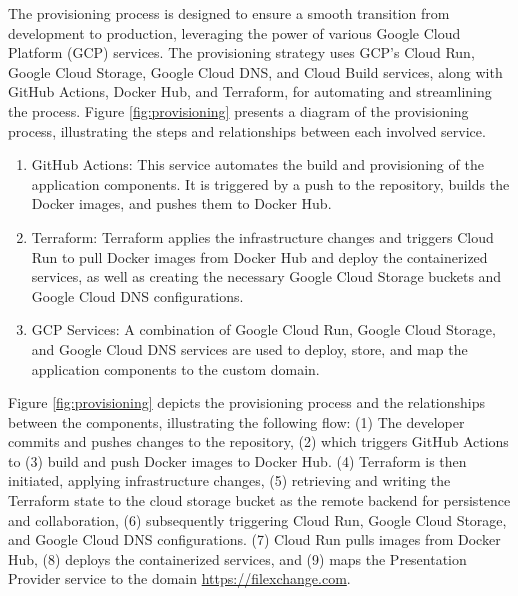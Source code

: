 \documentclass[a4paper,fleqn]{cas-dc}
\begin{document}
The provisioning process is designed to ensure a smooth transition from development to production, leveraging the power of various Google Cloud Platform (GCP) services. The provisioning strategy uses GCP's Cloud Run, Google Cloud Storage, Google Cloud DNS, and Cloud Build services, along with GitHub Actions, Docker Hub, and Terraform, for automating and streamlining the process. Figure \ref{fig:provisioning} presents a diagram of the provisioning process, illustrating the steps and relationships between each involved service.

\begin{enumerate}
\item GitHub Actions: This service automates the build and provisioning of the application components. It is triggered by a push to the repository, builds the Docker images, and pushes them to Docker Hub.
\item Terraform: Terraform applies the infrastructure changes and triggers Cloud Run to pull Docker images from Docker Hub and deploy the containerized services, as well as creating the necessary Google Cloud Storage buckets and Google Cloud DNS configurations.
\item GCP Services: A combination of Google Cloud Run, Google Cloud Storage, and Google Cloud DNS services are used to deploy, store, and map the application components to the custom domain.
\end{enumerate}

Figure \ref{fig:provisioning} depicts the provisioning process and the relationships between the components, illustrating the following flow: (1) The developer commits and pushes changes to the repository, (2) which triggers GitHub Actions to (3) build and push Docker images to Docker Hub. (4) Terraform is then initiated, applying infrastructure changes, (5) retrieving and writing the Terraform state to the cloud storage bucket as the remote backend for persistence and collaboration, (6) subsequently triggering Cloud Run, Google Cloud Storage, and Google Cloud DNS configurations. (7) Cloud Run pulls images from Docker Hub, (8) deploys the containerized services, and (9) maps the Presentation Provider service to the domain \url{https://filexchange.com}.
\end{document}
